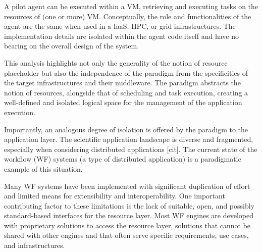 \documentclass{sig-alternate}
\begin{document}
A pilot agent can be executed within a VM, retrieving and executing tasks on the
resources of (one or more) VM.  Conceptually, the role and functionalities of
the \pilot agent are the same when used in a IaaS, HPC, or grid
infrastructures. The implementation details are isolated within the agent code
itself and have no bearing on the overall design of the \pilot system.

This analysis highlights not only the generality of the notion of resource
placeholder but also the independence of the \pilot paradigm from the
specificities of the target infrastructures and their middleware. The \pilot
paradigm abstracts the notion of resources, alongside that of scheduling and
task execution, creating a well-defined and isolated logical space for the
management of the application execution.




Importantly, an analogous degree of isolation is offered by the \pilot paradigm
to the application layer. The scientific application landscape is diverse and
fragmented, especially when considering distributed applications [cit]. The
current state of the workflow (WF) systems (a type of distributed application)
is a paradigmatic example of this situation.

Many WF systems have been implemented with significant duplication of effort and
limited means for extensibility and interoperability. One important contributing
factor to these limitations is the lack of suitable, open, and possibly
standard-based interfaces for the resource layer. Most WF engines are developed
with proprietary solutions to access the resource layer, solutions that cannot
be shared with other engines and that often serve specific requirements, use
cases, and infrastructures.
\end{document}

